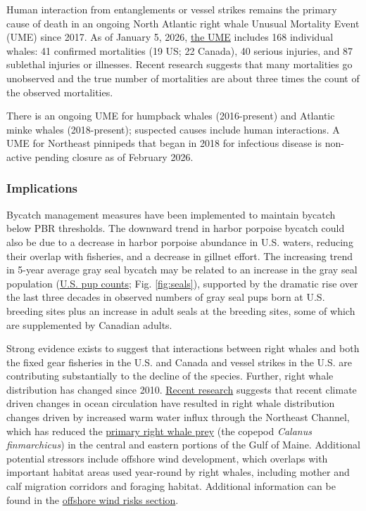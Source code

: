 \documentclass[
  10pt,
]{article}
\begin{document}
Human interaction from entanglements or vessel strikes remains the primary cause of death in an ongoing North Atlantic right whale Unusual Mortality Event (UME) since 2017. As of January 5, 2026, \href{https://www.fisheries.noaa.gov/national/marine-life-distress/2017-2026-north-atlantic-right-whale-unusual-mortality-event}{the UME} includes 168 individual whales: 41 confirmed mortalities (19 US; 22 Canada), 40 serious injuries, and 87 sublethal injuries or illnesses. Recent research suggests that many mortalities go unobserved and the true number of mortalities are about three times the count of the observed mortalities.

There is an ongoing UME for humpback whales (2016-present) and Atlantic minke whales (2018-present); suspected causes include human interactions. A UME for Northeast pinnipeds that began in 2018 for infectious disease is non-active pending closure as of February 2026.

\subsubsection{Implications}\label{implications-4}

Bycatch management measures have been implemented to maintain bycatch below PBR thresholds. The downward trend in harbor porpoise bycatch could also be due to a decrease in harbor porpoise abundance in U.S. waters, reducing their overlap with fisheries, and a decrease in gillnet effort. The increasing trend in 5-year average gray seal bycatch may be related to an increase in the gray seal population (\href{https://noaa-edab.github.io/catalog/seal_pups.html}{U.S. pup counts}; Fig. \ref{fig:seals}), supported by the dramatic rise over the last three decades in observed numbers of gray seal pups born at U.S. breeding sites plus an increase in adult seals at the breeding sites, some of which are supplemented by Canadian adults.

Strong evidence exists to suggest that interactions between right whales and both the fixed gear fisheries in the U.S. and Canada and vessel strikes in the U.S. are contributing substantially to the decline of the species. Further, right whale distribution has changed since 2010. \href{https://noaa-edab.github.io/catalog/narw.html}{Recent research} suggests that recent climate driven changes in ocean circulation have resulted in right whale distribution changes driven by increased warm water influx through the Northeast Channel, which has reduced the \href{https://noaa-edab.github.io/catalog/preyfield_energy.html}{primary right whale prey} (the copepod \emph{Calanus finmarchicus}) in the central and eastern portions of the Gulf of Maine. Additional potential stressors include offshore wind development, which overlaps with important habitat areas used year-round by right whales, including mother and calf migration corridors and foraging habitat. Additional information can be found in the \hyperref[other-ocean-uses-offshore-wind]{offshore wind risks section}.
\end{document}
